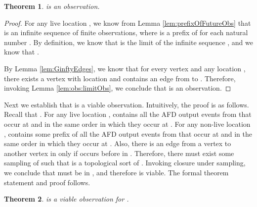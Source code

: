 \documentclass[11pt]{article}
\newtheorem{theorem}{Theorem}
\numberwithin{theorem}{section}
\begin{document}
 \begin{theorem}\label{thm:GinftyIsObs}
  is an observation.
 \end{theorem}
 \begin{proof}
 For any live location , we know from Lemma \ref{lem:prefixOfFutureObs} that  is an infinite sequence of finite observations, where  is a prefix of  for each natural number . By definition, 
we know that   is the limit of the infinite sequence , and we know that .
 
 By Lemma \ref{lem:GinftyEdges}, we know that for every vertex  and any location ,
there exists a vertex  with location
 and  contains an edge from  to .
 Therefore, invoking Lemma \ref{lem:obs:limitObs}, we conclude that  is an observation.
 \end{proof}





 Next we establish that  is a viable observation. Intuitively, the proof is as follows. Recall that . For any live location ,  contains all the AFD output events from  that occur at  and in the same order in which they occur at . For any non-live location ,  contains some prefix of all the AFD output events from  that occur at  and in the same order in which they occur at . Also, there is an edge from a vertex  to another vertex  in  only if  occurs before  in . Therefore, there must exist some sampling  of  such that  is a topological sort of . Invoking closure under sampling, we conclude that  must be in , and therefore  is viable. The formal theorem statement and proof follows.
 
 \begin{theorem}\label{thm:GinftyIsViable}
  is a viable observation for .
 \end{theorem}
\end{document}
